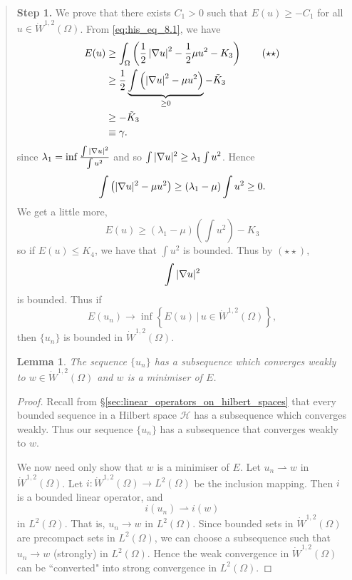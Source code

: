 \documentclass[10pt, oneside, reqno]{amsart}
\theoremstyle{plain}%
\newtheorem{lem}[thm]{Lemma}
\numberwithin{equation}{section}
\theoremstyle{definition}
\theoremstyle{remark}
\newcommand{\given}{ \, | \,}
\begin{document}
\begin{quote}\textbf{Step 1.}
	We prove that there exists $C_1 > 0$ such that $E(u) \geq - C_1$ for all $u \in \dot W^{1, 2}(\Omega)$.  From \eqref{eq:his_eq_8.1}, we have \begin{align*}
		E(u) &\geq \int_\Omega \left( \frac{1}{2} \left| \nabla u \right|^2 - \frac{1}{2} \mu u^2 - K_3 \right) \tag{$\star \star$} \\
		&\geq \frac{1}{2} \underbrace{\int \left( \left| \nabla u \right|^2 - \mu u^2 \right)}_{\geq 0} - \tilde K_3 \\
		& \geq - \tilde K_3 \\
		& \equiv \gamma.
	\end{align*} since $\lambda_1 = \inf \frac{\int|\nabla u |^2}{\int u^2}$ and so $\int |\nabla u|^2 \geq \lambda_1 \int u^2$.  Hence \[
		\int \left( |\nabla u |^2 - \mu u^2 \right) \geq (\lambda_1 - \mu) \int u^2 \geq 0.
	\]  We get a little more, \[
		E(u) \geq (\lambda_1 - \mu) \left(\int u^2 \right)
 - K_3	\] so if $E(u) \leq K_4$, we have that $\int u^2$ is bounded.  Thus by $(\star \star)$, \[
 	\int |\nabla u|^2
 \] is bounded.  Thus if \[
	E(u_n) \rightarrow \inf \left\{E(u) \given u \in \dot W^{1, 2}(\Omega) \right\},
\] then $\{ u_n \}$ is bounded in $\dot W^{1 ,2}(\Omega)$. 

\begin{lem}
	 The sequence $\{ u_n \}$ has a subsequence which converges weakly to $w  \in \dot W^{1, 2}(\Omega)$ and $w$ is a minimiser of $E$.
\end{lem}
\begin{proof}
	Recall from \S \ref{sec:linear_operators_on_hilbert_spaces} that every bounded sequence in a Hilbert space $\mathcal H$ has a subsequence which converges weakly. Thus our sequence $\{ u_n \}$ has a subsequence that converges weakly to $w$.  
	
	We now need only show that $w$ is a minimiser of $E$.   Let $u_n \rightharpoonup w$ in $\dot W^{1, 2}(\Omega)$.  Let $i: \dot W^{1, 2}(\Omega) \rightarrow L^2(\Omega)$ be the inclusion mapping.  Then $i$ is a bounded linear operator, and \[
		i(u_n) \rightharpoonup i(w)
	\] in $L^2(\Omega)$.  That is, $u_n \rightarrow w$ in $L^2(\Omega)$.  Since bounded sets in $\dot W^{1, 2}(\Omega)$ are precompact sets in $L^2(\Omega)$, we can choose a subsequence such that $u_n \rightarrow w$ (strongly) in $L^2(\Omega)$.  Hence the weak convergence in $\dot W^{1, 2}(\Omega)$ can be ``converted" into strong convergence in $L^2(\Omega)$.
	

\end{proof}
\end{quote}
\end{document}
